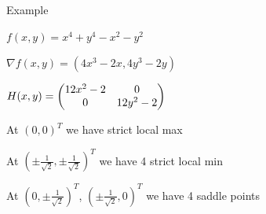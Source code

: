 \documentclass[11pt,compress,t,notes=noshow, xcolor=table]{beamer}
\begin{document}
\begin{framei}{Example}
\item $f(x,y) = x^4 + y^4 - x^2 - y^2$
\item $\nabla f(x,y) = (4x^3 - 2x, 4y^3 - 2y)$
\item $H(x,y) = \begin{pmatrix} 
12x^2 - 2 &  0          \\
0         & 12y^2 - 2
 \end{pmatrix}$
\item At $(0,0)^T$ we have strict local max
\item At $(\pm \frac1{\sqrt{2}}, \pm \frac1{\sqrt{2}})^T$ we have 4 strict local min
\item At $(0, \pm \frac1{\sqrt{2}})^T$, $(\pm \frac1{\sqrt{2}}, 0)^T$ we have 4 saddle points
\end{framei}

\endlecture
\end{document}
